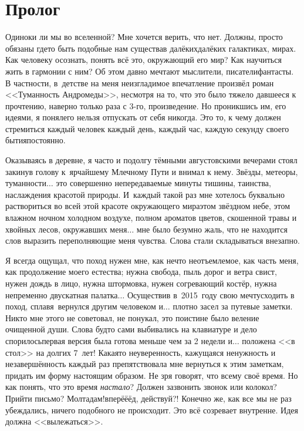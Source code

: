 \newpage
{
\thispagestyle{empty}
\section*{Пролог}

Одиноки ли мы во вселенной? Мне хочется верить, что нет. Должны, просто обязаны где\sdash то быть подобные нам существа\mdash в далёких\sdash далёких галактиках, мирах. Как человеку осознать, понять всё это, окружающий его мир? Как научиться жить в гармонии с ним? Об этом давно мечтают мыслители, писатели\sdash фантасты. В частности, в~детстве на меня неизгладимое впечатление произвёл роман <<Туманность Андромеды>>\cite{ТуманностьАндромеды}, несмотря на то, что это было тяжело давшееся к прочтению, наверно только раза с 3-го, произведение. Но проникшись им, его идеями, я понял\mdash его нельзя отпускать от себя ни\sdash ко\sdash гда. Это то, к чему должен стремиться каждый человек каждый день, каждый час, каждую секунду своего бытия\mdash постоянно. 

Оказываясь в деревне, я часто и подолгу тёмными августовскими вечерами стоял закинув голову к~ярчайшему Млечному Пути и внимал к нему. Звёзды, метеоры, туманности$\ldots$ это совершенно непередаваемые минуты тишины, таинства, наслаждения красотой природы. И~каждый такой раз мне хотелось буквально раствориться во всей этой красоте окружающего мира\mdash этом звёздном небе, этом влажном ночном холодном воздухе, полном ароматов цветов, скошенной травы и хвойных лесов, окружавших меня$\ldots$ мне было безумно жаль, что не находится слов выразить переполняющие меня чувства. Слова стали складываться внезапно. 

Я всегда ощущал, что поход нужен мне, как нечто неотъемлемое, как часть меня, как продолжение моего естества; нужна свобода, пыль дорог и ветра свист, нужен дождь в лицо, нужна штормовка, нужен согревающий костёр, нужна непременно двускатная палатка$\ldots$ Осуществив в~2015~году свою мечту\mdash сходить в поход, сплав\mdash я~вернулся другим человеком и$\ldots$ плотно засел за путевые заметки. Никто мне этого не советовал, не понукал, это поистине было веление очищенной души. Слова будто сами выбивались на клавиатуре и дело спорилось\mdash первая версия была готова меньше чем за 2 недели и$\ldots$ положена <<в стол>> на долгих 7~лет! Какая\sdash то неуверенность, кажущаяся ненужность и незавершённость каждый раз препятствовала мне вернуться к этим заметкам, придать им форму настоящим образом. Не зря говорят, что всему своё время. Но как понять, что это время \textit{настало}? Должен зазвонить звонок или колокол? Прийти письмо? Мол\mdash та\sdash дам!\mdash вперё\sdash ё\sdash ёд, действуй?! Конечно же, как все мы не раз убеждались, ничего подобного не происходит. Это всё созревает внутренне. Идея должна <<вылежаться>>.

}
